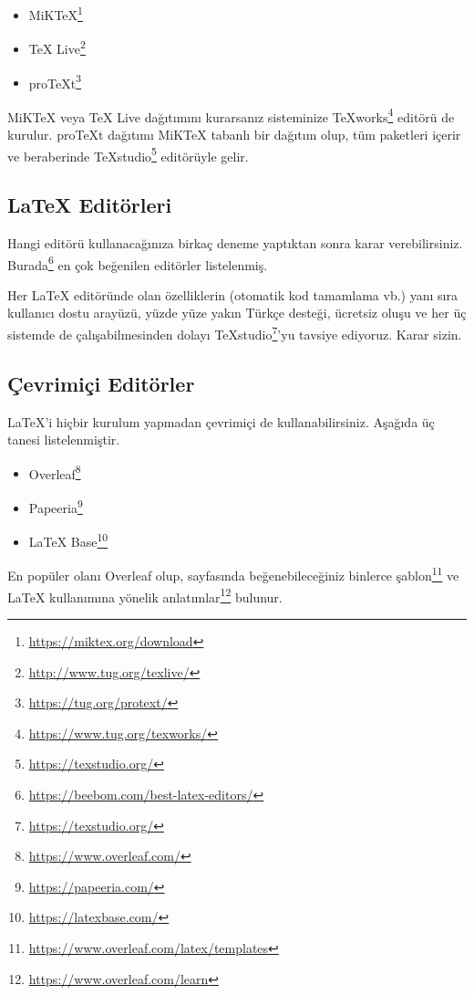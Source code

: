 \documentclass[
  10pt,
]{scrbook}
\providecommand{\tightlist}{%
  \setlength{\itemsep}{0pt}\setlength{\parskip}{0pt}}
\renewcommand{\href}[2]{#2\footnote{\url{#1}}}
\begin{document}
\begin{itemize}
\tightlist
\item
  \href{https://miktex.org/download}{MiKTeX}
\item
  \href{http://www.tug.org/texlive/}{TeX Live}
\item
  \href{https://tug.org/protext/}{proTeXt}
\end{itemize}

MiKTeX veya TeX Live dağıtımını kurarsanız sisteminize
\href{https://www.tug.org/texworks/}{TeXworks} editörü de kurulur. proTeXt dağıtımı MiKTeX tabanlı bir
dağıtım olup, tüm paketleri içerir ve beraberinde
\href{https://texstudio.org/}{TeXstudio} editörüyle gelir.

\hypertarget{latex-edituxf6rleri}{%
\subsection{LaTeX Editörleri}\label{latex-edituxf6rleri}}

Hangi editörü kullanacağınıza birkaç deneme yaptıktan sonra karar
verebilirsiniz. \href{https://beebom.com/best-latex-editors/}{Burada} en çok
beğenilen editörler listelenmiş.

Her LaTeX editöründe olan özelliklerin (otomatik kod tamamlama vb.) yanı
sıra kullanıcı dostu arayüzü, yüzde yüze yakın Türkçe desteği, ücretsiz
oluşu ve her üç sistemde de çalışabilmesinden dolayı
\href{https://texstudio.org/}{TeXstudio}'yu tavsiye ediyoruz. Karar sizin.

\hypertarget{uxe7evrimiuxe7i-edituxf6rler}{%
\subsection{Çevrimiçi Editörler}\label{uxe7evrimiuxe7i-edituxf6rler}}

LaTeX'i hiçbir kurulum yapmadan çevrimiçi de kullanabilirsiniz. Aşağıda
üç tanesi listelenmiştir.

\begin{itemize}
\tightlist
\item
  \href{https://www.overleaf.com/}{Overleaf}
\item
  \href{https://papeeria.com/}{Papeeria}
\item
  \href{https://latexbase.com/}{LaTeX Base}
\end{itemize}

En popüler olanı Overleaf olup, sayfasında beğenebileceğiniz binlerce
\href{https://www.overleaf.com/latex/templates}{şablon} ve LaTeX kullanımına yönelik
\href{https://www.overleaf.com/learn}{anlatımlar} bulunur.
\end{document}
